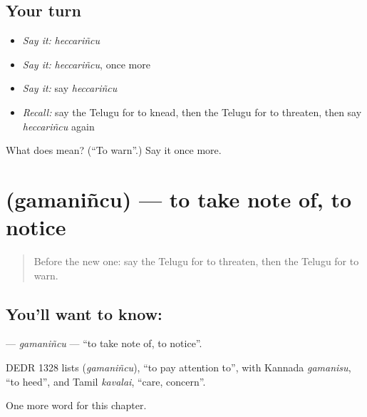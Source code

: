 \subsection*{Your turn}
\begin{itemize}
\raggedright
  \item \emph{Say it:} \emph{heccariñcu}
  \item \emph{Say it:} \emph{heccariñcu}, once more
  \item \emph{Say it:} say \emph{heccariñcu}
  \item \emph{Recall:} say the Telugu for to knead, then the Telugu for to threaten, then say \emph{heccariñcu} again
\end{itemize}

\begin{tcolorbox}[breakable,colback=teal!4,colframe=teal!35!black,title={Before you move on}]
What does  mean? (\textquotedblleft{}To warn\textquotedblright{}.) Say it once more.
\end{tcolorbox}
\section[\texorpdfstring{\te{గమనించు} (gamaniñcu)}{గమనించు (gamaniñcu)}]{ (gamaniñcu) — to take note of, to notice}

\label{lesson:TE-C285-gamanincu}



\begin{quote}
Before the new one: say the Telugu for to threaten, then the Telugu for to warn.
\end{quote}

\subsection*{You'll want to know: }
\textbf{} — \emph{gamaniñcu} — \textquotedblleft{}to take note of, to notice\textquotedblright{}.

\begin{cousinweb}
DEDR 1328 lists \textbf{} (\emph{gamaniñcu}), \textquotedblleft{}to pay attention to\textquotedblright{}, with Kannada \emph{gamanisu}, \textquotedblleft{}to heed\textquotedblright{}, and Tamil \emph{kavalai}, \textquotedblleft{}care, concern\textquotedblright{}.
\end{cousinweb}

\begin{grammarlens}[title={What you've built}]
One more word for this chapter.
\end{grammarlens}


